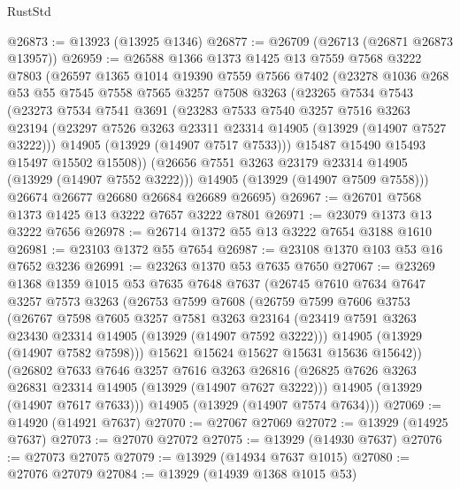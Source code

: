 \begin{lexlean}{RustStd}
\begin{coremodule}
@26873 := @13923 (@13925 @1346)
@26877 := @26709 (@26713 (@26871 @26873 @13957))
@26959 := @26588
    @1366
    @1373
    @1425
    @13
    @7559
    @7568
    @3222
    @7803
    (@26597
      @1365
      @1014
      @19390
      @7559
      @7566
      @7402
      (@23278
        @1036
        @268
        @53
        @55
        @7545
        @7558
        @7565
        @3257
        @7508
        @3263
        (@23265
          @7534
          @7543
          (@23273
            @7534
            @7541
            @3691
            (@23283
              @7533
              @7540
              @3257
              @7516
              @3263
              @23194
              (@23297 @7526 @3263 @23311 @23314 @14905 (@13929 (@14907 @7527 @3222)))
              @14905
              (@13929 (@14907 @7517 @7533)))
            @15487
            @15490
            @15493
            @15497
            @15502
            @15508))
        (@26656 @7551 @3263 @23179 @23314 @14905 (@13929 (@14907 @7552 @3222)))
        @14905
        (@13929 (@14907 @7509 @7558)))
      @26674
      @26677
      @26680
      @26684
      @26689
      @26695)
@26967 := @26701 @7568 @1373 @1425 @13 @3222 @7657 @3222 @7801
@26971 := @23079 @1373 @13 @3222 @7656
@26978 := @26714 @1372 @55 @13 @3222 @7654 @3188 @1610
@26981 := @23103 @1372 @55 @7654
@26987 := @23108 @1370 @103 @53 @16 @7652 @3236
@26991 := @23263 @1370 @53 @7635 @7650
@27067 := @23269
    @1368
    @1359
    @1015
    @53
    @7635
    @7648
    @7637
    (@26745
      @7610
      @7634
      @7647
      @3257
      @7573
      @3263
      (@26753
        @7599
        @7608
        (@26759
          @7599
          @7606
          @3753
          (@26767
            @7598
            @7605
            @3257
            @7581
            @3263
            @23164
            (@23419 @7591 @3263 @23430 @23314 @14905 (@13929 (@14907 @7592 @3222)))
            @14905
            (@13929 (@14907 @7582 @7598)))
          @15621
          @15624
          @15627
          @15631
          @15636
          @15642))
      (@26802
        @7633
        @7646
        @3257
        @7616
        @3263
        @26816
        (@26825 @7626 @3263 @26831 @23314 @14905 (@13929 (@14907 @7627 @3222)))
        @14905
        (@13929 (@14907 @7617 @7633)))
      @14905
      (@13929 (@14907 @7574 @7634)))
@27069 := @14920 (@14921 @7637)
@27070 := @27067 @27069
@27072 := @13929 (@14925 @7637)
@27073 := @27070 @27072
@27075 := @13929 (@14930 @7637)
@27076 := @27073 @27075
@27079 := @13929 (@14934 @7637 @1015)
@27080 := @27076 @27079
@27084 := @13929 (@14939 @1368 @1015 @53)

\end{coremodule}
\end{lexlean}
